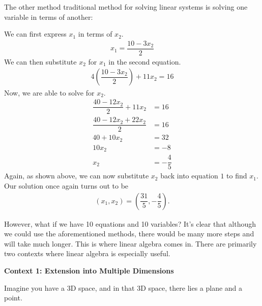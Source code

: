 \documentclass[12pt]{article}
\begin{document}
The other method traditional method for solving linear systems is solving one variable in terms of another: \par
\begin{tcolorbox}[problem]
    We can first express $x_1$ in terms of $x_2$. \begin{align*}
        x_1 = \dfrac{10 - 3x_2}{2}
    \end{align*}
    We can then substitute $x_2$ for $x_1$ in the second equation. \begin{align*}
        4\left(\dfrac{10 - 3x_2}{2}\right) + 11x_2 = 16
    \end{align*}
    Now, we are able to solve for $x_2$. \begin{align*}
        \dfrac{40 - 12x_2}{2} + 11x_2 &= 16 \\[6pt]
        \dfrac{40 - 12x_2 + 22x_2}{2} & = 16 \\[6pt]
        40 + 10x_2 &= 32 \\[6pt]
        10x_2 &= -8 \\[6pt]
        x_2 &= -\dfrac{4}{5}
    \end{align*}
    Again, as shown above, we can now substitute $x_2$ back into equation $1$ to find $x_1$. Our solution once again turns out to be \begin{align*}
        \boxed{(x_1, x_2) = \left(\dfrac{31}{5}, -\dfrac{4}{5}\right)}.
    \end{align*}
\end{tcolorbox}

However, what if we have 10 equations and 10 variables? It's clear that although we could use the aforementioned methods, there would be many more steps and will take much longer. This is where linear algebra comes in. There are primarily two contexts where linear algebra is especially useful. \par

\newpage

\textbf{Context 1: Extension into Multiple Dimensions} \par

Imagine you have a 3D space, and in that 3D space, there lies a plane and a point. \par

\begin{center}
\end{center}
\end{document}
